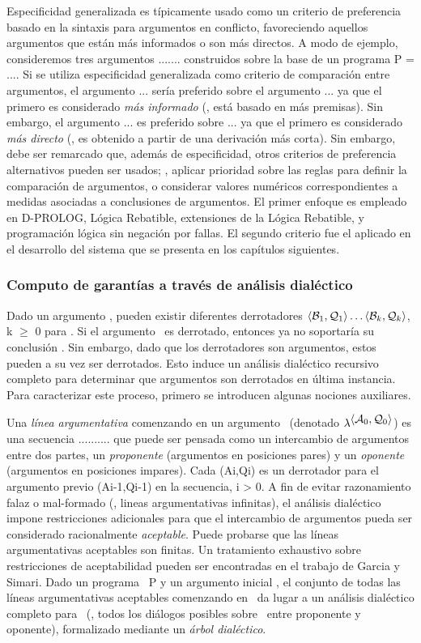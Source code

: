 Especificidad generalizada es típicamente usado como un criterio de preferencia basado en la sintaxis 
para argumentos en conflicto, favoreciendo aquellos argumentos que están más informados o son más directos.
A modo de ejemplo, consideremos tres argumentos ....... construidos sobre la base de un programa P = ....
Si se utiliza especificidad generalizada como criterio de comparación entre argumentos, el argumento ...
sería preferido sobre el argumento ... ya que el primero es considerado \textit{más informado} (\ie , está
basado en más premisas). Sin embargo, el argumento ... es preferido sobre ... ya que el primero es considerado
\textit{más directo} (\ie , es obtenido a partir de una derivación más corta). Sin embargo, debe ser remarcado
que, además de especificidad, otros criterios de preferencia alternativos pueden ser usados; \eg , aplicar
prioridad sobre las reglas para definir la comparación de argumentos, o considerar valores numéricos correspondientes a medidas asociadas a conclusiones de argumentos. El primer enfoque es empleado en
D-PROLOG, Lógica Rebatible, extensiones de la Lógica Rebatible, y programación lógica sin negación por fallas.
El segundo criterio fue el aplicado en el desarrollo del sistema que se presenta en los capítulos siguientes.

\subsubsection{Computo de garantías a través de análisis dialéctico}

Dado un argumento \AQ , pueden existir diferentes derrotadores $\mbox{$\langle \mbox{${\mathcal B_1}$},\mbox{${\mathcal Q_1}$} \rangle $}\ldots\mbox{$\langle \mbox{${\mathcal B_k}$},\mbox{${\mathcal Q_k}$} \rangle $}$, k $\ge$ 0 para
\AQ . Si el argumento \AQ\ es derrotado, entonces ya no soportaría su conclusión \ArgQ . Sin embargo,
dado que los derrotadores son argumentos, estos pueden a su vez ser derrotados. Esto induce un 
análisis dialéctico recursivo completo para determinar que argumentos son derrotados en última instancia.
Para caracterizar este proceso, primero se introducen algunas nociones auxiliares.

Una \textit{línea argumentativa} comenzando en un argumento \AoQo\ (denotado $\lambda^{\mbox{$\langle \mbox{${\mathcal A_0}$},\mbox{${\mathcal Q_0}$} \rangle $}}$) es una 
secuencia .......... que puede ser pensada como un intercambio de argumentos entre dos partes, un 
\textit{proponente} (argumentos en posiciones pares) y un \textit{oponente} (argumentos en posiciones
impares). Cada (Ai,Qi) es un derrotador para el argumento previo (Ai-1,Qi-1) en la secuencia, i > 0.
A fin de evitar razonamiento falaz o mal-formado (\eg , lineas argumentativas infinitas), el análisis
dialéctico impone restricciones adicionales para que el intercambio de argumentos pueda ser considerado
racionalmente \textit{aceptable}. Puede probarse que las líneas argumentativas aceptables son finitas. 
Un tratamiento exhaustivo sobre restricciones de aceptabilidad pueden ser encontradas en el trabajo de
Garcia y Simari. %
Dado un programa \DLP\ P y un argumento inicial \AoQo , el conjunto de todas las líneas argumentativas
aceptables comenzando en \AoQo\ da lugar a un análisis dialéctico completo para \AoQo\ (\ie , todos los
diálogos posibles sobre \AoQo\ entre proponente y oponente), formalizado mediante un \textit{árbol dialéctico}.

